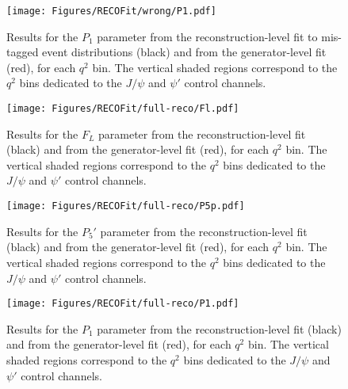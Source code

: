 \begin{figure}[!hbt]
  \centering
  \texttt{[image: Figures/RECOFit/wrong/P1.pdf]}
  \caption{Results for the $P_1$ parameter from the reconstruction-level fit to mis-tagged event distributions (black) and from the generator-level fit (red), for each $q^2$ bin.
    The vertical shaded regions correspond to the $q^2$ bins dedicated to the $J/\psi$ and $\psi'$ control channels.}
  \label{fig:wrong-closure-p1}
\end{figure}

\begin{figure}[!hbt]
  \centering
  \texttt{[image: Figures/RECOFit/full-reco/Fl.pdf]}
  \caption{Results for the $F_L$ parameter from the reconstruction-level fit (black) and from the generator-level fit (red), for each $q^2$ bin.
    The vertical shaded regions correspond to the $q^2$ bins dedicated to the $J/\psi$ and $\psi'$ control channels.}
  \label{fig:fullreco-closure-fl}
\end{figure}


\begin{figure}[!hbt]
  \centering
  \texttt{[image: Figures/RECOFit/full-reco/P5p.pdf]}
  \caption{Results for the $P_5'$ parameter from the reconstruction-level fit (black) and from the generator-level fit (red), for each $q^2$ bin.
    The vertical shaded regions correspond to the $q^2$ bins dedicated to the $J/\psi$ and $\psi'$ control channels.}
  \label{fig:fullreco-closure-p5p}
\end{figure}


\begin{figure}[!hbt]
  \centering
  \texttt{[image: Figures/RECOFit/full-reco/P1.pdf]}
  \caption{Results for the $P_1$ parameter from the reconstruction-level fit (black) and from the generator-level fit (red), for each $q^2$ bin.
    The vertical shaded regions correspond to the $q^2$ bins dedicated to the $J/\psi$ and $\psi'$ control channels.}
  \label{fig:fullreco-closure-p1}
\end{figure}




